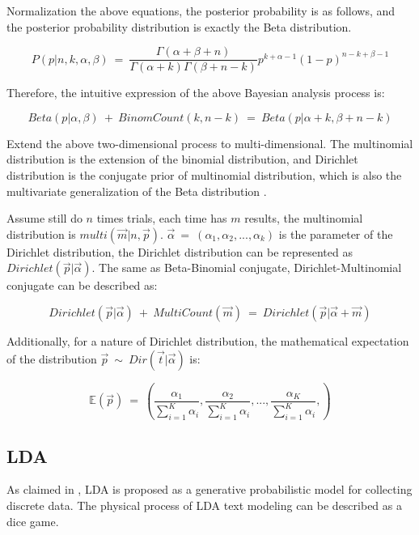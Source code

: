 Normalization the above equations, the posterior probability is as follows, and the posterior probability distribution is exactly the Beta distribution.

\begin{equation}
    P(p|n,k,\alpha,\beta)\ =\ \frac{\Gamma(\alpha+\beta+n)}{\Gamma(\alpha+k)\Gamma(\beta+n-k)}p^{k+\alpha-1}{(1-p)}^{n-k+\beta-1}
\end{equation}

Therefore, the intuitive expression of the above Bayesian analysis process is:

\begin{equation}
    Beta(p|\alpha,\beta)\ +\ BinomCount(k, n-k)\ =\ Beta(p|\alpha+k, \beta+n-k)
\end{equation}

Extend the above two-dimensional process to multi-dimensional. The multinomial distribution is the extension of the binomial distribution, and Dirichlet distribution is the conjugate prior of multinomial distribution, which is also the multivariate generalization of the Beta distribution \cite{lin2016dirichlet}.

Assume still do $n$ times trials, each time has $m$ results, the multinomial distribution is $multi(\vec m|n, \vec p)$. $\vec \alpha\ =\ (\alpha_1,\alpha_2,...,\alpha_k)$ is the parameter of the Dirichlet distribution, the Dirichlet distribution can be represented as $Dirichlet(\vec p|\vec \alpha)$. The same as Beta-Binomial conjugate, Dirichlet-Multinomial conjugate can be described as:

\begin{equation}
    Dirichlet(\vec p|\vec \alpha)\ +\ MultiCount(\vec m)\ =\ Dirichlet(\vec p|\vec \alpha+\vec m)
\end{equation}

Additionally, for a nature of Dirichlet distribution, the mathematical expectation of the distribution $\vec p\ \sim\ Dir(\vec t|\vec\alpha)$ is:

\begin{equation}\label{expectation}
    \mathbb{E}(\vec p)\ =\ (\frac{\alpha_1}{\sum_{i=1}^{K}\alpha_i}, \frac{\alpha_2}{\sum_{i=1}^{K}\alpha_i},..., \frac{\alpha_K}{\sum_{i=1}^{K}\alpha_i},)
\end{equation}

\subsection{LDA}
As claimed in \cite{blei2003latent}, LDA is proposed as a generative probabilistic model for collecting discrete data. 
The physical process of LDA text modeling can be described as a dice game.  

